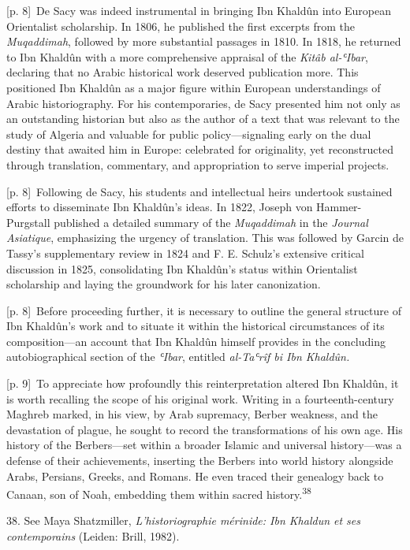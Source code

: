 \documentclass[10pt,a4paper]{article}
\begin{document}
{\scriptsize\color{gray} [p. 8]}\ De Sacy was indeed instrumental in bringing Ibn Khaldûn into European Orientalist scholarship. In 1806, he published the first excerpts from the \textit{Muqaddimah}, followed by more substantial passages in 1810. In 1818, he returned to Ibn Khaldûn with a more comprehensive appraisal of the \textit{Kitâb al-ʿIbar}, declaring that no Arabic historical work deserved publication more. This positioned Ibn Khaldûn as a major figure within European understandings of Arabic historiography. For his contemporaries, de Sacy presented him not only as an outstanding historian but also as the author of a text that was relevant to the study of Algeria and valuable for public policy—signaling early on the dual destiny that awaited him in Europe: celebrated for originality, yet reconstructed through translation, commentary, and appropriation to serve imperial projects.\par
{\scriptsize\color{gray} [p. 8]}\ Following de Sacy, his students and intellectual heirs undertook sustained efforts to disseminate Ibn Khaldûn’s ideas. In 1822, Joseph von Hammer-Purgstall published a detailed summary of the \textit{Muqaddimah} in the \textit{Journal Asiatique}, emphasizing the urgency of translation. This was followed by Garcin de Tassy’s supplementary review in 1824 and F. E. Schulz’s extensive critical discussion in 1825, consolidating Ibn Khaldûn’s status within Orientalist scholarship and laying the groundwork for his later canonization.\par
{\scriptsize\color{gray} [p. 8]}\ Before proceeding further, it is necessary to outline the general structure of Ibn Khaldûn’s work and to situate it within the historical circumstances of its composition—an account that Ibn Khaldûn himself provides in the concluding autobiographical section of the \textit{ʿIbar}, entitled \textit{al-Taʿrîf bi Ibn Khaldûn.}\par
{\scriptsize\color{gray} [p. 9]}\ To appreciate how profoundly this reinterpretation altered Ibn Khaldûn, it is worth recalling the scope of his original work. Writing in a fourteenth-century Maghreb marked, in his view, by Arab supremacy, Berber weakness, and the devastation of plague, he sought to record the transformations of his own age. His history of the Berbers—set within a broader Islamic and universal history—was a defense of their achievements, inserting the Berbers into world history alongside Arabs, Persians, Greeks, and Romans. He even traced their genealogy back to Canaan, son of Noah, embedding them within sacred history.\nobreak\textsuperscript{38}\par{\small 38. See Maya Shatzmiller, \textit{L’historiographie mérinide: Ibn Khaldun et ses contemporains} (Leiden: Brill, 1982).\par}
\end{document}

